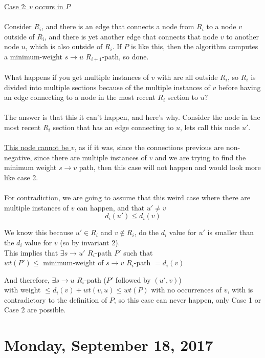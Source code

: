\documentclass[12pt]{article}
\begin{document}
\underline{Case 2: $v$ occurs in $P$}\\
\\
Consider $R_i$, and there is an edge that connects a node from $R_i$ to a node $v$ outside of $R_i$, and there is yet another edge that connects that node $v$ to another node $u$, which is also outside of $R_i$. If $P$ is like this, then the algorithm computes a minimum-weight $s\rightarrow u$ $R_{i+1}$-path, so done.\\
\\
What happens if you get multiple instances of $v$ with are all outside $R_i$, so $R_i$ is divided into multiple sections because of the multiple instances of $v$ before having an edge connecting to a node in the most recent $R_i$ section to $u$?\\
\\
The answer is that this it can't happen, and here's why.
Consider the node in the most recent $R_i$ section that has an edge connecting to $u$, lets call this node $u'$.\\
\\
\underline{This node cannot be $v$}, as if it was, since the connections previous are non-negative, since there are multiple instances of $v$ and we are trying to find the minimum weight $s\rightarrow v$ path, then this case will not happen and would look more like case 2.
\\
\\
For contradiction, we are going to assume that this weird case where there are multiple instances of $v$ can happen, and that $u' \neq v$
$$d_i (u') \leq d_i (v)$$

We know this because $u' \in R_i$ and $v \not\in R_i$, do the $d_i$ value for $u'$ is smaller than the $d_i$ value for $v$ (so by invariant 2).\\

This implies that $\exists s\rightarrow u'$ $R_i$-path $P'$ such that\\
$wt(P') \leq $  minimum-weight of $s\rightarrow v$ $R_i$-path $= d_i (v)$

And therefore, $\exists s\rightarrow u$ $R_i$-path ($P'$ followed by $(u',v)$)\\
 with weight $\leq d_i (v) + wt(v,u) \leq wt(P)$ with no occurrences of $v$, with is contradictory to the definition of $P$, so this case can never happen, only Case 1 or Case 2 are possible.

\newpage

\section{Monday, September 18, 2017}
\end{document}
